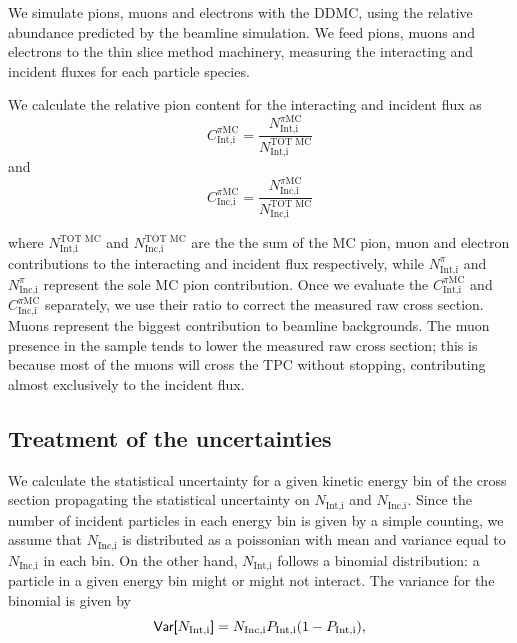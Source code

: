 \documentclass[aps,prl,twocolumn,showpacs,superscriptaddress,groupedaddress]{revtex4}  %
\begin{document}
We simulate pions, muons and electrons with the DDMC, using the relative abundance predicted by the beamline simulation.  We feed pions, muons and electrons to the thin slice method machinery, measuring the interacting and incident fluxes for each particle species.

We calculate the relative pion content for the interacting and incident flux  as
\begin{equation}
C^{\pi \text{MC}}_{\text{Int,i}}  =  \frac{N^{\pi \text{MC}}_{\text{Int,i}}}{ N^{\text{TOT MC}}_{\text{Int,i}} } 
\end{equation}
and 
\begin{equation}
C^{\pi \text{MC}}_{\text{Inc,i}}  =  \frac{N^{\pi \text{MC}}_{\text{Inc,i}}}{ N^{\text{TOT MC}}_{\text{Inc,i}} } 
\end{equation}

where 
$N^{\text{TOT MC}}_{\text{Int,i}}$ and $N^{\text{TOT MC}}_{\text{Inc,i}}$ are the the sum of the MC pion, muon and electron contributions to the interacting and incident flux respectively, while $N^{\pi}_{\text{Int,i}}$ and $N^{\pi}_{\text{Inc,i}}$ represent the sole MC pion contribution. Once we evaluate the $C^{\pi \text{MC}}_{\text{Int,i}}$ and  $C^{\pi \text{MC}}_{\text{Inc,i}}$ separately, we use their ratio to correct the measured raw cross section. Muons represent the biggest contribution to beamline backgrounds. The muon presence in the sample tends to lower the measured raw cross section; this is because most of the muons will cross the TPC without stopping, contributing almost exclusively to the incident flux. 



\subsection{\label{sec:Corrections}Treatment of the uncertainties}
We calculate the statistical uncertainty for a given kinetic energy bin of the cross section propagating the statistical uncertainty on $N_{\text{Int,i}}$ and $N_{\text{Inc,i}}$.  Since the number of incident particles in each energy bin is given by a simple counting, we assume that $N_{\text{Inc,i}}$ is distributed as a poissonian with mean and variance equal to $N_{\text{Inc,i}}$ in each bin.  
On the other hand, $N_{\text{Int,i}}$ follows a binomial distribution: a particle in a given energy bin might or might not interact.  The variance for the binomial is given by  
\begin{equation}
\text{\textsf{Var[}} N_{\text{Int,i}} \text{\textsf{]}}
 = N_{\text{Inc,i}}P_{\text{Int,i}}(1-P_{\text{Int,i}}),
\label{eq:binVar}
\end{equation}
\end{document}
